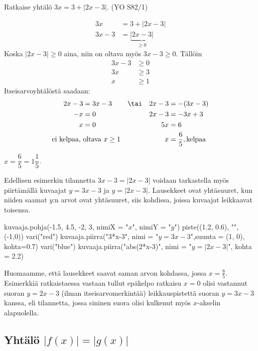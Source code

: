 \begin{esimerkki}
Ratkaise yhtälö $3x=3+|2x-3|$. (YO S82/1)

\begin{esimratk}
\begin{align*}
3x & =3+|2x-3|  \\
3x-3 & =\underbrace{|2x-3|}_{\geq 0}
\end{align*}
Koska $|2x-3|\geq0$ aina, niin on oltava myös $3x-3\geq0$. Tällöin
\begin{align*}
	3x-3&\geq0 \\
	3x&\geq3 \\
	x&\geq1
\end{align*}
Itseisarvoyhtälöstä saadaan:
\begin{align*}
	2x-3&=3x-3   & &\tai & 2x-3 & =-(3x-3) \\
	-x&=0        && & 2x-3&=-3x+3 \\
	x&=0         && & 5x&=6 \\
	\text{ei kelpaa, } & \text{oltava $x\geq1$}  && & x&=\frac{6}{5}, \text{kelpaa}
\end{align*}
\end{esimratk}

\begin{esimvast}
$x=\dfrac{6}{5}=1\dfrac{1}{5}$.
\end{esimvast}
\end{esimerkki}

Edellisen esimerkin tilannetta $3x-3=|2x-3|$ voidaan tarkastella myös piirtämällä kuvaajat $y=3x-3$ ja $y=|2x-3|$. Lausekkeet ovat yhtäsuuret, kun niiden saamat $y$:n arvot ovat yhtäsuuret, siis kohdissa, joissa kuvaajat leikkaavat toisensa.

\begin{kuva}
    kuvaaja.pohja(-1.5, 4.5, -2, 3, nimiX = "$x$", nimiY = "$y$")
    piste((1.2, 0.6), "",(-1,0))
    vari("red")
    kuvaaja.piirra("3*x-3", nimi = "$y=3x - 3$",suunta = (1, 0), kohta=0.7)
    vari("blue")
    kuvaaja.piirra("abs(2*x-3)", nimi = "$y=|2x - 3|$", kohta = 2.2)
\end{kuva}

Huomaamme, että lausekkeet saavat saman arvon kohdassa, jossa \mbox{$x=\frac{6}{5}$}. Esimerkkiä ratkaistaessa vastaan tullut epäkelpo ratkaisu $x=0$ olisi vastannut suoran $y=2x-3$ (ilman itseisarvomerkintää) leikkauspistettä suoran $y=3x-3$ kanssa, eli tilannetta, jossa sininen suora olisi kulkenut myös $x$-akselin alapuolella.

\subsection*{Yhtälö $|f(x)|=|g(x)|$}

